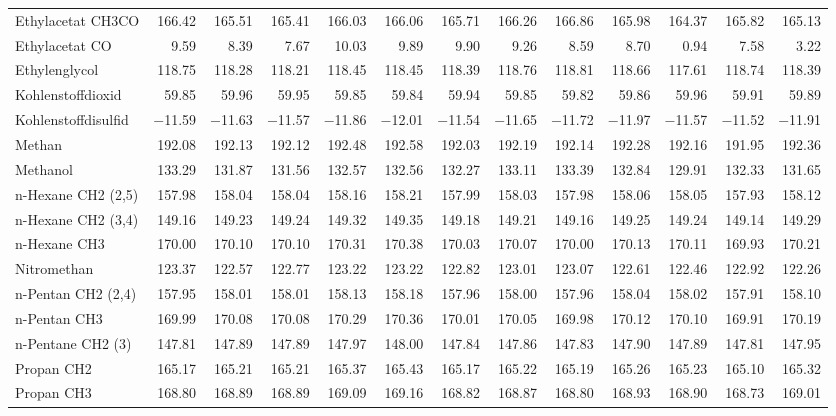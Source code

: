 \begin{table}[ht!]
{\begin{tabular}{lrrrrrrrrrrrr}
    Ethylacetat CH3CO & 166.42 & 165.51 & 165.41 & 166.03 & 166.06 & 165.71 & 166.26 & 166.86 & 165.98 & 164.37 & 165.82 & 165.13 \\
    Ethylacetat CO & 9.59  & 8.39  & 7.67  & 10.03 & 9.89  & 9.90  & 9.26  & 8.59  & 8.70  & 0.94  & 7.58  & 3.22 \\
    Ethylenglycol & 118.75 & 118.28 & 118.21 & 118.45 & 118.45 & 118.39 & 118.76 & 118.81 & 118.66 & 117.61 & 118.74 & 118.39 \\
    Kohlenstoffdioxid & 59.85 & 59.96 & 59.95 & 59.85 & 59.84 & 59.94 & 59.85 & 59.82 & 59.86 & 59.96 & 59.91 & 59.89 \\
    Kohlenstoffdisulfid & $-$11.59 & $-$11.63 & $-$11.57 & $-$11.86 & $-$12.01 & $-$11.54 & $-$11.65 & $-$11.72 & $-$11.97 & $-$11.57 & $-$11.52 & $-$11.91 \\
    Methan & 192.08 & 192.13 & 192.12 & 192.48 & 192.58 & 192.03 & 192.19 & 192.14 & 192.28 & 192.16 & 191.95 & 192.36 \\
    Methanol & 133.29 & 131.87 & 131.56 & 132.57 & 132.56 & 132.27 & 133.11 & 133.39 & 132.84 & 129.91 & 132.33 & 131.65 \\
    n-Hexane CH2 (2,5) & 157.98 & 158.04 & 158.04 & 158.16 & 158.21 & 157.99 & 158.03 & 157.98 & 158.06 & 158.05 & 157.93 & 158.12 \\
    n-Hexane CH2 (3,4) & 149.16 & 149.23 & 149.24 & 149.32 & 149.35 & 149.18 & 149.21 & 149.16 & 149.25 & 149.24 & 149.14 & 149.29 \\
    n-Hexane CH3 & 170.00 & 170.10 & 170.10 & 170.31 & 170.38 & 170.03 & 170.07 & 170.00 & 170.13 & 170.11 & 169.93 & 170.21 \\
    Nitromethan & 123.37 & 122.57 & 122.77 & 123.22 & 123.22 & 122.82 & 123.01 & 123.07 & 122.61 & 122.46 & 122.92 & 122.26 \\
    n-Pentan CH2 (2,4) & 157.95 & 158.01 & 158.01 & 158.13 & 158.18 & 157.96 & 158.00 & 157.96 & 158.04 & 158.02 & 157.91 & 158.10 \\
    n-Pentan CH3 & 169.99 & 170.08 & 170.08 & 170.29 & 170.36 & 170.01 & 170.05 & 169.98 & 170.12 & 170.10 & 169.91 & 170.19 \\
    n-Pentane CH2 (3)  & 147.81 & 147.89 & 147.89 & 147.97 & 148.00 & 147.84 & 147.86 & 147.83 & 147.90 & 147.89 & 147.81 & 147.95 \\
    Propan CH2 & 165.17 & 165.21 & 165.21 & 165.37 & 165.43 & 165.17 & 165.22 & 165.19 & 165.26 & 165.23 & 165.10 & 165.32 \\
    Propan CH3 & 168.80 & 168.89 & 168.89 & 169.09 & 169.16 & 168.82 & 168.87 & 168.80 & 168.93 & 168.90 & 168.73 & 169.01 \\

\end{tabular}}
\end{table}
